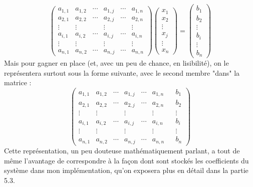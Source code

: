 \documentclass[french]{article}
\begin{document}
\begin{equation*}
	\begin{pmatrix}
		a_{1,1} & a_{1,2} & \cdots & a_{1,j} & \cdots & a_{1,n}\\
		a_{2,1} & a_{2,2} & \cdots & a_{2,j} & \cdots & a_{2,n}\\
		\vdots  & \vdots  & & \vdots & & \vdots\\
		a_{i,1} & a_{i,2} & \cdots & a_{i,j} & \cdots & a_{i,n}\\
		\vdots  & \vdots  &  & \vdots & &\vdots\\
		a_{n,1} & a_{n,2} & \cdots & a_{n,j} & \cdots & a_{n,n}
	\end{pmatrix}
	\begin{pmatrix}
		x_1\\
		x_2\\
		\vdots\\
		x_j\\
		\vdots\\
		x_n
	\end{pmatrix}
	=
	\begin{pmatrix}
		b_1\\
		b_2\\
		\vdots\\
		b_i\\
		\vdots\\
		b_n
	\end{pmatrix}
\end{equation*}
Mais pour gagner en place (et, avec un peu de chance, en lisibilité), on le représentera surtout sous la forme suivante, avec le second membre "dans" la matrice :
\begin{equation*}
	\begin{pmatrix}
		a_{1,1} & a_{1,2} & \cdots & a_{1,j} & \cdots & a_{1,n}&&b_1\\
		a_{2,1} & a_{2,2} & \cdots & a_{2,j} & \cdots & a_{2,n}&&b_2\\
		\vdots  & \vdots  & & \vdots & & \vdots&&\vdots\\
		a_{i,1} & a_{i,2} & \cdots & a_{i,j} & \cdots & a_{i,n}&&b_i\\
		\vdots  & \vdots  &  & \vdots & &\vdots&&\vdots\\
		a_{n,1} & a_{n,2} & \cdots & a_{n,j} & \cdots & a_{n,n}&&b_n
	\end{pmatrix}
\end{equation*}
Cette représentation, un peu douteuse mathématiquement parlant, a tout de même l'avantage de correspondre à la façon dont sont stockés les coefficients du système dans mon implémentation, qu'on exposera plus en détail dans la partie 5.3.
\end{document}
